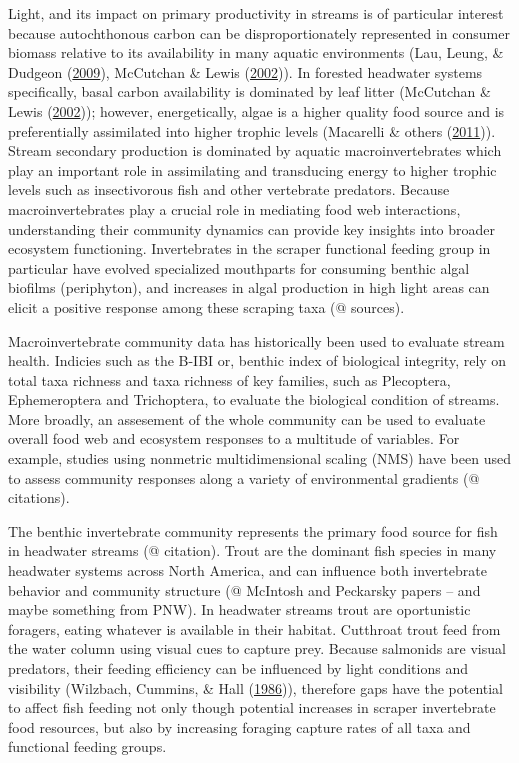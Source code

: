 \documentclass[double,12pt]{beavtex}
\begin{document}
  Light, and its impact on primary productivity in streams is of
  particular interest because autochthonous carbon can be
  disproportionately represented in consumer biomass relative to its
  availability in many aquatic environments (Lau, Leung, \& Dudgeon
  (\protect\hyperlink{ref-Lau2009}{2009}), McCutchan \& Lewis
  (\protect\hyperlink{ref-McCutchan2002}{2002})). In forested headwater
  systems specifically, basal carbon availability is dominated by leaf
  litter (McCutchan \& Lewis
  (\protect\hyperlink{ref-McCutchan2002}{2002})); however, energetically,
  algae is a higher quality food source and is preferentially assimilated
  into higher trophic levels (Macarelli \& others
  (\protect\hyperlink{ref-Macarelli2011}{2011})). Stream secondary
  production is dominated by aquatic macroinvertebrates which play an
  important role in assimilating and transducing energy to higher trophic
  levels such as insectivorous fish and other vertebrate predators.
  Because macroinvertebrates play a crucial role in mediating food web
  interactions, understanding their community dynamics can provide key
  insights into broader ecosystem functioning. Invertebrates in the
  scraper functional feeding group in particular have evolved specialized
  mouthparts for consuming benthic algal biofilms (periphyton), and
  increases in algal production in high light areas can elicit a positive
  response among these scraping taxa (@ sources).
  
  Macroinvertebrate community data has historically been used to evaluate
  stream health. Indicies such as the B-IBI or, benthic index of
  biological integrity, rely on total taxa richness and taxa richness of
  key families, such as Plecoptera, Ephemeroptera and Trichoptera, to
  evaluate the biological condition of streams. More broadly, an
  assesement of the whole community can be used to evaluate overall food
  web and ecosystem responses to a multitude of variables. For example,
  studies using nonmetric multidimensional scaling (NMS) have been used to
  assess community responses along a variety of environmental gradients (@
  citations).
  
  The benthic invertebrate community represents the primary food source
  for fish in headwater streams (@ citation). Trout are the dominant fish
  species in many headwater systems across North America, and can
  influence both invertebrate behavior and community structure (@ McIntosh
  and Peckarsky papers -- and maybe something from PNW). In headwater
  streams trout are oportunistic foragers, eating whatever is available in
  their habitat. Cutthroat trout feed from the water column using visual
  cues to capture prey. Because salmonids are visual predators, their
  feeding efficiency can be influenced by light conditions and visibility
  (Wilzbach, Cummins, \& Hall
  (\protect\hyperlink{ref-Wilzbach1986}{1986})), therefore gaps have the
  potential to affect fish feeding not only though potential increases in
  scraper invertebrate food resources, but also by increasing foraging
  capture rates of all taxa and functional feeding groups.
  
\end{document}
